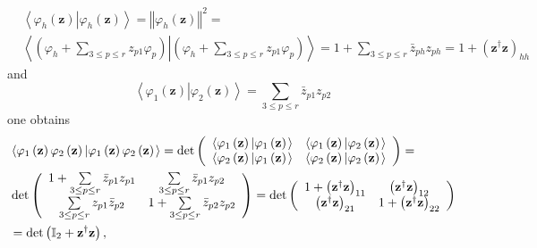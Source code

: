 \documentclass[aps,preprint]{revtex4}%
\begin{document}
\begin{align}
&  \left\langle \varphi_{h}\left(  \mathbf{z}\right)  \left\vert \varphi
_{h}\left(  \mathbf{z}\right)  \right.  \right\rangle =\left\Vert \varphi
_{h}\left(  \mathbf{z}\right)  \right\Vert ^{2}=\nonumber\\
&  \left\langle \left(  \varphi_{h}+\sum\limits_{3\leq p\leq r}z_{p1}%
\varphi_{p}\right)  \left\vert \left(  \varphi_{h}+\sum\limits_{3\leq p\leq
r}z_{p1}\varphi_{p}\right)  \right.  \right\rangle =1+\sum\limits_{3\leq p\leq
r}\bar{z}_{ph}z_{ph}=1+\left(  \mathbf{z}^{\dagger}\mathbf{z}\right)
_{hh}\nonumber
\end{align}
and
\begin{equation}
\left\langle \varphi_{1}\left(  \mathbf{z}\right)  \left\vert \varphi
_{2}\left(  \mathbf{z}\right)  \right.  \right\rangle =\sum\limits_{3\leq
p\leq r}\bar{z}_{p1}z_{p2}%
\end{equation}
one obtains
\begin{align}
&  \left\langle \varphi_{1}\left(  \mathbf{z}\right)  \varphi_{2}\left(
\mathbf{z}\right)  \left\vert \varphi_{1}\left(  \mathbf{z}\right)
\varphi_{2}\left(  \mathbf{z}\right)  \right.  \right\rangle =\det\left(
\begin{array}
[c]{cc}%
\left\langle \varphi_{1}\left(  \mathbf{z}\right)  \left\vert \varphi
_{1}\left(  \mathbf{z}\right)  \right.  \right\rangle  & \left\langle
\varphi_{1}\left(  \mathbf{z}\right)  \left\vert \varphi_{2}\left(
\mathbf{z}\right)  \right.  \right\rangle \\
\left\langle \varphi_{2}\left(  \mathbf{z}\right)  \left\vert \varphi
_{1}\left(  \mathbf{z}\right)  \right.  \right\rangle  & \left\langle
\varphi_{2}\left(  \mathbf{z}\right)  \left\vert \varphi_{2}\left(
\mathbf{z}\right)  \right.  \right\rangle
\end{array}
\right)  =\nonumber\\
&  \det\left(
\begin{array}
[c]{cc}%
1+\sum\limits_{3\leq p\leq r}\bar{z}_{p1}z_{p1} & \sum\limits_{3\leq p\leq
r}\bar{z}_{p1}z_{p2}\\
\sum\limits_{3\leq p\leq r}z_{p1}\bar{z}_{p2} & 1+\sum\limits_{3\leq p\leq
r}\bar{z}_{p2}z_{p2}%
\end{array}
\right)  =\det\left(
\begin{array}
[c]{cc}%
1+\left(  \mathbf{z}^{\dagger}\mathbf{z}\right)  _{11} & \left(
\mathbf{z}^{\dagger}\mathbf{z}\right)  _{12}\\
\left(  \mathbf{z}^{\dagger}\mathbf{z}\right)  _{21} & 1+\left(
\mathbf{z}^{\dagger}\mathbf{z}\right)  _{22}%
\end{array}
\right) \nonumber\\
&  =\det\left(  \mathbb{I}_{2}+\mathbf{z}^{\dagger}\mathbf{z}\right)  ,
\end{align}
\end{document}
